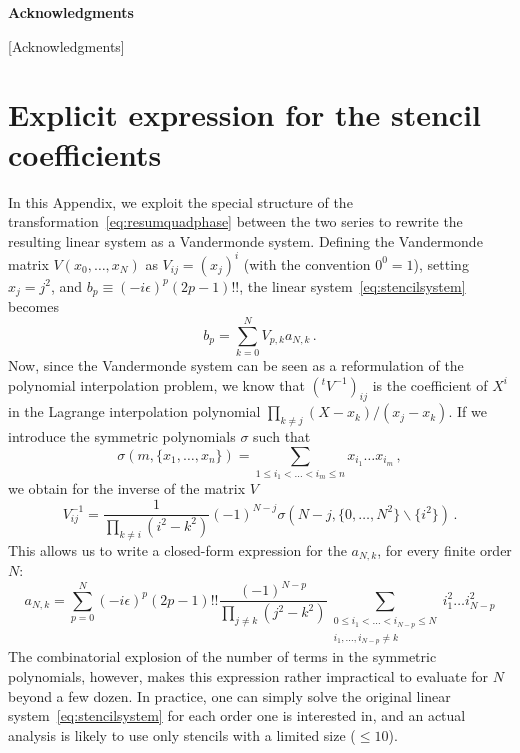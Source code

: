 \documentclass[aps,showpacs,%
prd,superscriptaddress,nofootinbib]{revtex4}
\newcommand{\be}{\begin{equation}}
\newcommand{\ee}{\end{equation}}
\begin{document}

\vspace{4.5mm}

\hspace{0.85in}
{\bf Acknowledgments}

\vspace{3.5mm}

[Acknowledgments]


\appendix

\section{Explicit expression for the stencil coefficients}
\label{app:vandermonde}

In this Appendix, we exploit the special structure of the transformation~\eqref{eq:resumquadphase} between the two series to rewrite the resulting linear system as a Vandermonde system. Defining the Vandermonde matrix $V(x_{0},\dots,x_{N})$ as $V_{ij} = (x_{j})^{i}$ (with the convention $0^{0} = 1$), setting $x_{j} = j^{2}$, and $b_{p} \equiv (-i\epsilon)^{p}(2p-1)!!$, the linear system~\eqref{eq:stencilsystem} becomes
\be
	b_{p} = \sum\limits_{k=0}^{N} V_{p,k} a_{N,k} \,.
\ee
Now, since the Vandermonde system can be seen as a reformulation of the polynomial interpolation problem, we know that $({}^{t}V^{-1})_{ij}$ is the coefficient of $X^{i}$ in the Lagrange interpolation polynomial $\prod_{k\neq j} (X-x_{k})/(x_{j} - x_{k})$. If we introduce the symmetric polynomials $\sigma$ such that
\be	
	\sigma(m, \{x_{1}, \dots, x_{n}\}) = \sum\limits_{1\leq i_{1}<\dots<i_{m}\leq n} x_{i_{1}}\dots x_{i_{m}} \,,
\ee
we obtain for the inverse of the matrix $V$
\be
	V^{-1}_{ij} = \frac{1}{\prod_{k\neq i} (i^{2} - k^{2})} (-1)^{N-j} \sigma(N-j, \{0,\dots,N^{2}\}\backslash \{i^{2}\}) \,.
\ee
This allows us to write a closed-form expression for the $a_{N,k}$, for every finite order $N$:
\be
	a_{N,k} = \sum\limits_{p=0}^{N} (-i\epsilon)^{p}(2p-1)!! \frac{(-1)^{N-p}}{\prod_{j\neq k} (j^{2}-k^{2})} \sum\limits_{\substack{ 0 \leq i_{1} < \dots < i_{N-p} \leq N \\ i_{1}, \dots, i_{N-p} \neq k}} i_{1}^{2}\dots i_{N-p}^{2}
\ee
The combinatorial explosion of the number of terms in the symmetric polynomials, however, makes this expression rather impractical to evaluate for $N$ beyond a few dozen. In practice, one can simply solve the original linear system~\eqref{eq:stencilsystem} for each order one is interested in, and an actual analysis is likely to use only stencils with a limited size ($\leq 10$).


%

\end{document}
